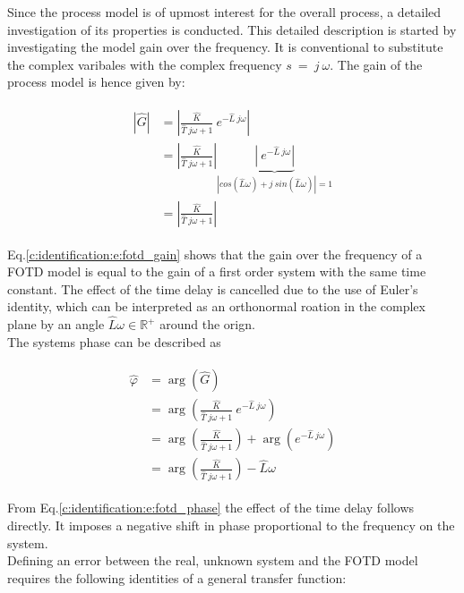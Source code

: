 Since the process model is of upmost interest for the overall process, a detailed investigation of its properties is conducted. This detailed description is started by investigating the model gain over the frequency. It is conventional to substitute the complex varibales with the complex frequency $s~=~j~\omega$. The gain of the process model is hence given by:

\begin{align}
\begin{split}
\left| \hat{G} \right| &= \left| \frac{\hat{K}}{\hat{T}~j\omega+1} ~ e^{-\hat{L}~j\omega} \right| \\
&= \left| \frac{\hat{K}}{\hat{T}~j\omega+1} \right| \underbrace{\left| ~ e^{-\hat{L}~j\omega} \right|}_{\left|cos(\hat{L}\omega)+j~sin(\hat{L}\omega)\right| = 1} \\
&= \left| \frac{\hat{K}}{\hat{T}~j\omega+1} \right|
\end{split}
\label{c:identification:e:fotd_gain}
\end{align}

Eq.\ref{c:identification:e:fotd_gain} shows that the gain over the frequency of a FOTD model is equal to the gain of a first order system with the same time constant. The effect of the time delay is cancelled due to the use of Euler's identity, which can be interpreted as an orthonormal roation in the complex plane by an angle $\hat{L}\omega \in \mathbb{R}^+$ around the orign.\\

The systems phase can be described as

\begin{align}
\begin{split}
\hat{\varphi} &= \arg\left( \hat{G} \right) \\
&= \arg\left(\frac{\hat{K}}{\hat{T}~j\omega+1} ~ e^{-\hat{L}~j\omega} \right) \\
&= \arg\left(\frac{\hat{K}}{\hat{T}~j\omega+1}\right) + \arg\left( e^{-\hat{L}~j\omega}\right) \\
&= \arg\left(\frac{\hat{K}}{\hat{T}~j\omega+1}\right) - \hat{L}\omega
\end{split}
\label{c:identification:e:fotd_phase}
\end{align}

From Eq.\ref{c:identification:e:fotd_phase} the effect of the time delay follows directly. It imposes a negative shift in phase proportional to the frequency on the system. \\

Defining an error between the real, unknown system and the FOTD model requires the following identities of a general transfer function:

